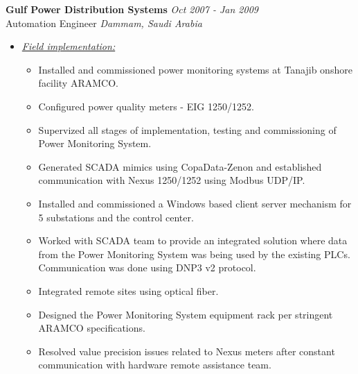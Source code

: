 \documentclass{article}
\begin{document}
    {\bf Gulf Power Distribution Systems} \hfill {\em Oct 2007 - Jan 2009} \\
    Automation Engineer \hfill {\em Dammam, Saudi Arabia} \\
    \begin{itemize}
    \item \underline{\it Field implementation:}
          \begin{itemize}
          \item Installed and commissioned power monitoring systems at Tanajib
                onshore facility ARAMCO.
          \item Configured power quality meters - EIG 1250/1252.
          \item Supervized all stages of implementation, testing and
                commissioning of Power Monitoring System.
          \item Generated SCADA mimics using CopaData-Zenon and established
                communication with Nexus 1250/1252 using Modbus UDP/IP.
          \item Installed and commissioned a Windows based client server
                mechanism for 5 substations and the control center.
          \item Worked with SCADA team to provide an integrated solution where
                data from the Power Monitoring System was being used by the
                existing PLCs. Communication was done using DNP3 v2 protocol.
          \item Integrated remote sites using optical fiber.
          \item Designed the Power Monitoring System equipment rack per
                stringent ARAMCO specifications.
          \item Resolved value precision issues related to Nexus meters after
                constant communication with hardware remote assistance team.
          \end{itemize}
    \end{itemize}
    \bigskip
\end{document}
